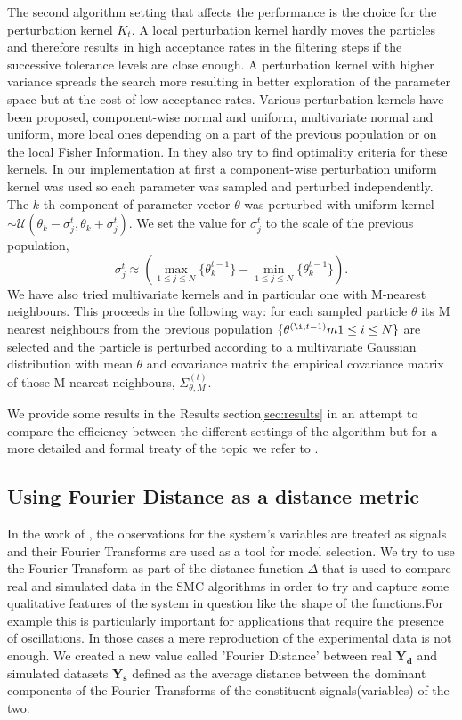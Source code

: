 The second algorithm setting that affects the performance is the choice for the perturbation kernel $K_{t}$. A local perturbation kernel hardly moves the particles and therefore results in high acceptance rates in the filtering steps if the successive tolerance levels are close enough.  A perturbation kernel with higher variance spreads the search more resulting in better exploration of the parameter space but at the cost of low acceptance rates. Various perturbation kernels have been proposed, component-wise normal and uniform, multivariate normal and uniform, more local ones depending on a part of the previous population or on the local Fisher Information. In \cite[] {filippi2011optimal} they also try to find optimality criteria for these kernels. In our implementation at first a component-wise perturbation uniform kernel was used so each parameter was sampled and perturbed independently. The $k$-th component of parameter vector $\theta$ was perturbed with uniform kernel $\sim \mathcal{U}(\theta_{k}-\sigma_{j}^{t}, \theta_{k}+\sigma_{j}^{t})$.  We set the value for $\sigma_{j}^{t}$ to the scale of the previous population,
\begin{equation}
\sigma_{j}^{t} \approx ( \underset{1 \le j \le N}{\max}\{\theta_{k}^{t-1}\} - \underset{1 \le j \le N}{\min}\{\theta_{k}^{t-1}\}).
\end{equation} 
We have also tried multivariate kernels and in particular one with M-nearest neighbours.  This proceeds in the following way:  for each sampled particle $\theta$ its M nearest neighbours from the previous population $\{ \theta^{(\i, t-1)}m 1 \le i \le N\}$ are selected and the particle is perturbed according to a multivariate Gaussian distribution with mean $\theta$ and covariance matrix the empirical covariance matrix of those M-nearest neighbours, $\Sigma_{\theta, M}^{(t)}$.  %

We provide some results in the Results section\ref{sec:results} in an attempt to compare the efficiency between the different settings of the algorithm but for a more detailed and formal treaty of the topic we refer to \cite[] {filippi2011optimal}. 
\subsection{Using Fourier Distance as a distance metric}
\label{sec:fourier}
In the work of \cite[] {konopka2010gene}, the observations for the system's variables are treated as signals and their Fourier Transforms are used as a tool for model selection. We try to use the Fourier Transform as part of the distance function $\Delta$ that is used to compare real and simulated data in the SMC algorithms in order to try and capture some qualitative features of the system in question like the shape of the functions.For example this is particularly important for applications that require the presence of oscillations. In those cases a mere reproduction of the experimental data is not enough. We created a new value called 'Fourier Distance' between real $\mathbf{Y_{d}}$ and simulated datasets $\mathbf{Y_{s}}$ defined as the average distance between the dominant components of the Fourier Transforms of the constituent signals(variables) of the two.

